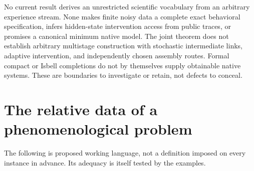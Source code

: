 \documentclass[11pt]{article}
\theoremstyle{remark}
\begin{document}
No current result derives an unrestricted scientific vocabulary from an arbitrary experience stream. None makes finite noisy data a complete exact behavioral specification, infers hidden-state intervention access from public traces, or promises a canonical minimum native model. The joint theorem does not establish arbitrary multistage construction with stochastic intermediate links, adaptive intervention, and independently chosen assembly routes. Formal compact or Isbell completions do not by themselves supply obtainable native systems. These are boundaries to investigate or retain, not defects to conceal.

\section{The relative data of a phenomenological problem}
\label{sec:data}

The following is proposed working language, not a definition imposed on every instance in advance. Its adequacy is itself tested by the examples.
\end{document}
